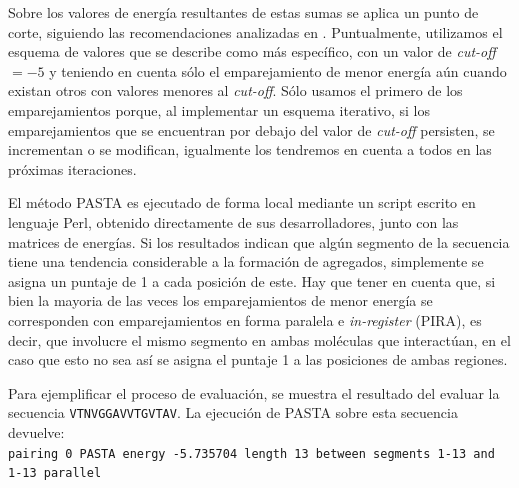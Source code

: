 Sobre los valores de energía resultantes de estas sumas se aplica un punto de corte, siguiendo las recomendaciones analizadas en \cite{walsh2014pasta}.
Puntualmente, utilizamos el esquema de valores que se describe como más específico, con un valor de \textit{cut-off}$=-5$ y teniendo en cuenta 
sólo el emparejamiento de menor energía aún cuando existan otros con valores menores al \textit{cut-off}.
Sólo usamos el primero de los emparejamientos porque, al implementar un esquema iterativo, si los emparejamientos que se encuentran por debajo  del valor de \textit{cut-off} persisten, se incrementan o se modifican,
igualmente los tendremos en cuenta a todos en las próximas iteraciones. 



El método PASTA es ejecutado de forma local mediante un script escrito en lenguaje Perl, obtenido directamente de sus desarrolladores, junto con las matrices de energías.
Si los resultados indican que algún segmento de la secuencia tiene una tendencia considerable a la formación de agregados, 
simplemente se asigna un puntaje de 1 a cada posición de este.
Hay que tener en cuenta que, si bien la mayoria de las veces los emparejamientos de menor energía se corresponden con emparejamientos en forma paralela e \textit{in-register} (PIRA), es decir, 
que involucre el mismo segmento en ambas moléculas que interactúan, en el caso que esto no sea así se asigna el puntaje 1 a las posiciones de ambas regiones. 

Para ejemplificar el proceso de evaluación, se muestra el resultado del evaluar la secuencia \texttt{VTNVGGAVVTGVTAV}.
La ejecución de PASTA sobre esta secuencia devuelve: \\
\noindent
\texttt{pairing 0  PASTA energy -5.735704  length 13  between segments 1-13 and 1-13  parallel}

